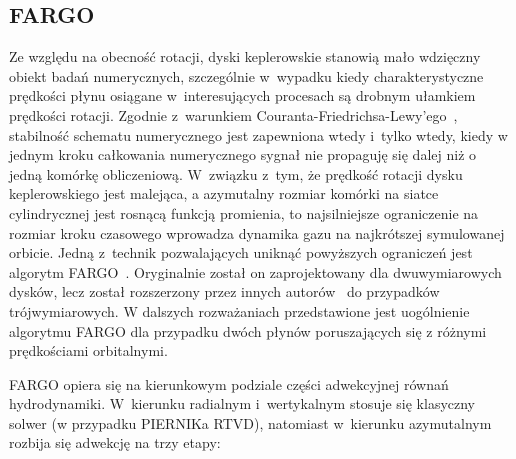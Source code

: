 \subsection{FARGO}
Ze względu na obecność rotacji, dyski keplerowskie stanowią mało wdzięczny
obiekt badań numerycznych, szczególnie w~wypadku kiedy charakterystyczne
prędkości płynu osiągane w~interesujących procesach są drobnym ułamkiem
prędkości rotacji. Zgodnie z~warunkiem Couranta-Friedrichsa-Lewy'ego~\cite{cir},
stabilność schematu numerycznego jest zapewniona wtedy i~tylko wtedy, kiedy w
jednym kroku całkowania numerycznego sygnał nie propaguję się dalej niż o jedną
komórkę obliczeniową. W~związku z~tym, że prędkość rotacji dysku keplerowskiego
jest malejąca, a azymutalny rozmiar komórki na siatce cylindrycznej jest rosnącą
funkcją promienia, to najsilniejsze ograniczenie na rozmiar kroku czasowego
wprowadza dynamika gazu na najkrótszej symulowanej orbicie. Jedną z~technik
pozwalających uniknąć powyższych ograniczeń jest algorytm FARGO~\citep{M00}.
Oryginalnie został on zaprojektowany dla dwuwymiarowych dysków, lecz został
rozszerzony przez innych autorów~\cite{KBK09} do przypadków trójwymiarowych.  W
dalszych rozważaniach przedstawione jest uogólnienie algorytmu FARGO dla
przypadku dwóch płynów poruszających się z różnymi prędkościami orbitalnymi.
%
\par FARGO opiera się na kierunkowym podziale części adwekcyjnej równań
hydrodynamiki. W~kierunku radialnym i~wertykalnym stosuje się klasyczny solwer
(w przypadku PIERNIKa RTVD), natomiast w~kierunku azymutalnym rozbija się
adwekcję na trzy etapy:
